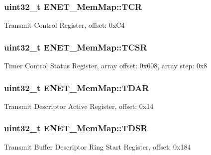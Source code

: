 \subsubsection[{T\+C\+R}]{\setlength{\rightskip}{0pt plus 5cm}uint32\+\_\+t E\+N\+E\+T\+\_\+\+Mem\+Map\+::\+T\+C\+R}\label{struct_e_n_e_t___mem_map_ab9bb7ecf57ffae10f969d3771994d87e}
Transmit Control Register, offset\+: 0x\+C4 \hypertarget{struct_e_n_e_t___mem_map_acc214c47096aabf0332175c3ff1ad529}{}
\subsubsection[{T\+C\+S\+R}]{\setlength{\rightskip}{0pt plus 5cm}uint32\+\_\+t E\+N\+E\+T\+\_\+\+Mem\+Map\+::\+T\+C\+S\+R}\label{struct_e_n_e_t___mem_map_acc214c47096aabf0332175c3ff1ad529}
Timer Control Status Register, array offset\+: 0x608, array step\+: 0x8 \hypertarget{struct_e_n_e_t___mem_map_abc933198128768f22ed4f8acec589c2f}{}
\subsubsection[{T\+D\+A\+R}]{\setlength{\rightskip}{0pt plus 5cm}uint32\+\_\+t E\+N\+E\+T\+\_\+\+Mem\+Map\+::\+T\+D\+A\+R}\label{struct_e_n_e_t___mem_map_abc933198128768f22ed4f8acec589c2f}
Transmit Descriptor Active Register, offset\+: 0x14 \hypertarget{struct_e_n_e_t___mem_map_a47f7c6593b849324f2b1eeca43fda4c7}{}
\subsubsection[{T\+D\+S\+R}]{\setlength{\rightskip}{0pt plus 5cm}uint32\+\_\+t E\+N\+E\+T\+\_\+\+Mem\+Map\+::\+T\+D\+S\+R}\label{struct_e_n_e_t___mem_map_a47f7c6593b849324f2b1eeca43fda4c7}
Transmit Buffer Descriptor Ring Start Register, offset\+: 0x184 \hypertarget{struct_e_n_e_t___mem_map_aef8b194a94a2a24c0f705e65af5bee24}{}

